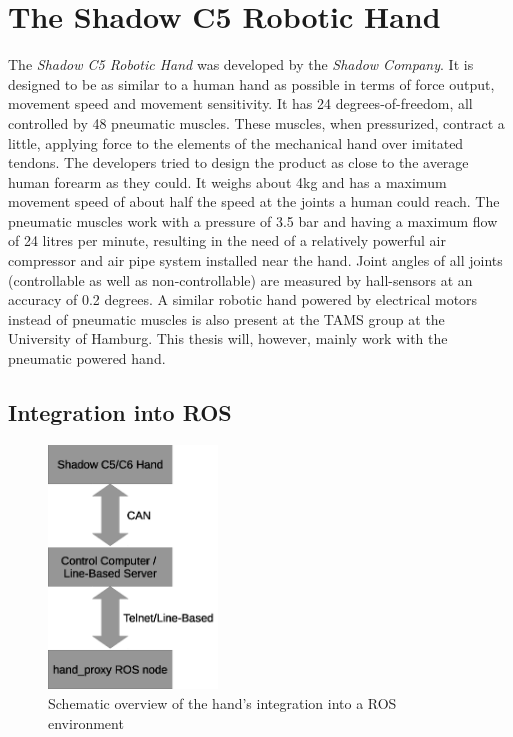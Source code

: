 \section{The Shadow C5 Robotic Hand}
The \textit{Shadow C5 Robotic Hand} was developed by the \textit{Shadow Company}. It is designed to be as similar to a human hand as possible\cite{web:robothand:spec} in terms of force output, movement speed and movement sensitivity. It has 24 degrees-of-freedom, all controlled by 48 pneumatic muscles. These muscles, when pressurized, contract a little, applying force to the elements of the mechanical hand over imitated tendons. The developers tried to design the product as close to the average human forearm as they could. It weighs about 4kg and has a maximum movement speed of about half the speed at the joints a human could reach. The pneumatic muscles work with a pressure of 3.5 bar and having a maximum flow of 24 litres per minute, resulting in the need of a relatively powerful air compressor and air pipe system installed near the hand. Joint angles of all joints (controllable as well as non-controllable) are measured by hall-sensors at an accuracy of 0.2 degrees.
A similar robotic hand powered by electrical motors instead of pneumatic muscles is also present at the TAMS group at the University of Hamburg. This thesis will, however, mainly work with the pneumatic powered hand. 

\subsection{Integration into ROS}

\begin{figure}
	\caption{\label{fig:hand:ros_integration}Schematic overview of the hand's integration into a ROS environment}
	\includegraphics[width=0.4\textwidth]{assets/chpt_basics/hand/ros_integration.eps}
\end{figure}

